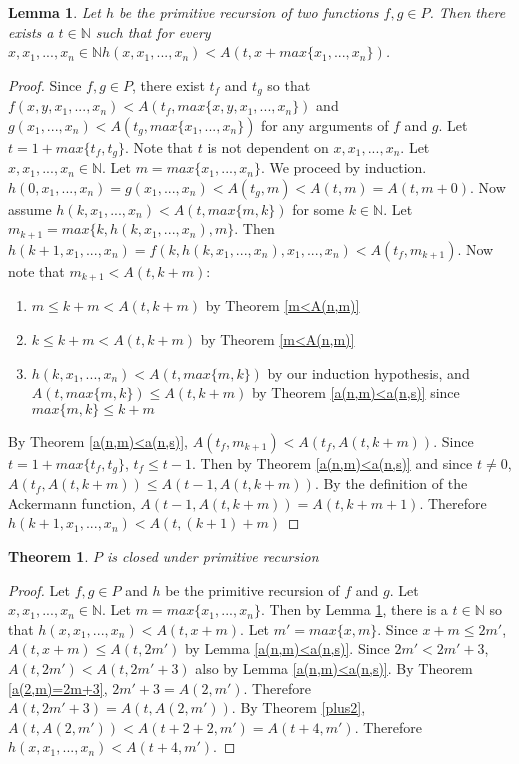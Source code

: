 \documentclass[12pt, letterpaper]{article}
\newtheorem{theorem}{Theorem}
\newtheorem{lemma}{Lemma}
\theoremstyle{case}
\begin{document}
    \begin{lemma}
      \label{recursionlemma}
      Let $h$ be the primitive recursion of two functions $f, g \in P$.
      Then there exists a $t \in \mathbb{N}$ such that
      for every $x, x_1, ..., x_n \in \mathbb{N}
      h(x, x_1, ..., x_n) < A(t, x + max\{x_1, ..., x_n\})$.
    \end{lemma}
    \begin{proof}
      Since $f, g \in P$, there exist $t_f$ and $t_g$ so that 
      $f(x, y, x_1, ..., x_n) < A(t_f, max\{x, y, x_1, ..., x_n\})$ and
      $g(x_1, ..., x_n) < A(t_g, max\{x_1, ..., x_n\})$ for any arguments of $f$ and $g$.
      Let $t = 1 + max\{t_f, t_g\}$. Note that $t$ is not dependent on $x, x_1, ..., x_n$.
      Let $x, x_1, ..., x_n \in \mathbb{N}$.
      Let $m = max\{x_1, ..., x_n\}$.
      We proceed by induction.
      $h(0, x_1, ..., x_n) = g(x_1, ..., x_n) < A(t_g, m) < A(t, m) = A(t, m + 0)$.
      Now assume $h(k, x_1, ..., x_n) < A(t, max\{m, k\})$ for some $k \in \mathbb{N}$.
      Let $m_{k+1} = max\{k, h(k, x_1, ..., x_n), m\}$.
      Then $h(k + 1, x_1, ..., x_n) = f(k, h(k, x_1, ..., x_n), x_1, ..., x_n) < A(t_f, m_{k+1})$.
      Now note that $m_{k+1} < A(t, k + m)$:
      \begin{enumerate}
        \item $m \leq k + m < A(t, k + m)$ by Theorem \ref{m<A(n,m)}
        \item $k \leq k + m < A(t, k + m)$ by Theorem \ref{m<A(n,m)}
        \item $h(k, x_1, ..., x_n) < A(t, max\{m, k\})$ by our induction hypothesis, and $A(t, max\{m, k\}) \leq
        A(t, k + m)$ by Theorem \ref{a(n,m)<a(n,s)} since $max\{m, k\} \leq k + m$
      \end{enumerate}
      By Theorem \ref{a(n,m)<a(n,s)}, $A(t_f, m_{k+1}) < A(t_f, A(t, k + m))$.
      Since $t = 1 + max\{t_f, t_g\}$, $t_f \leq t - 1$.
      Then by Theorem \ref{a(n,m)<a(n,s)} and since $t \neq 0$, $A(t_f, A(t, k + m)) \leq A(t - 1, A(t, k + m))$.
      By the definition of the Ackermann function, $A(t - 1, A(t, k + m)) = A(t, k + m + 1)$.
      Therefore $h(k + 1, x_1, ..., x_n) < A(t, (k + 1) + m)$
    \end{proof}

    \begin{theorem}
      $P$ is closed under primitive recursion
    \end{theorem}
    \begin{proof}
      Let $f, g \in P$ and $h$ be the primitive recursion of $f$ and $g$.
      Let $x, x_1, ..., x_n \in \mathbb{N}$.
      Let $m = max\{x_1, ..., x_n\}$.
      Then by Lemma \ref{recursionlemma}, there is a $t \in \mathbb{N}$ so that
      $h(x, x_1, ..., x_n) < A(t, x + m)$.
      Let $m' = max\{x, m\}$.
      Since $x + m \leq 2m'$, $A(t, x + m) \leq A(t, 2m')$ by Lemma \ref{a(n,m)<a(n,s)}.
      Since $2m' < 2m' + 3$, $A(t, 2m') < A(t, 2m' + 3)$ also by Lemma \ref{a(n,m)<a(n,s)}.
      By Theorem \ref{a(2,m)=2m+3}, $2m' + 3 = A(2, m')$.
      Therefore $A(t, 2m' + 3) = A(t, A(2, m'))$.
      By Theorem \ref{plus2}, $A(t, A(2, m')) < A(t + 2 + 2, m') = A(t + 4, m')$.
      Therefore $h(x, x_1, ..., x_n) < A(t + 4, m')$.
    \end{proof}
\end{document}
